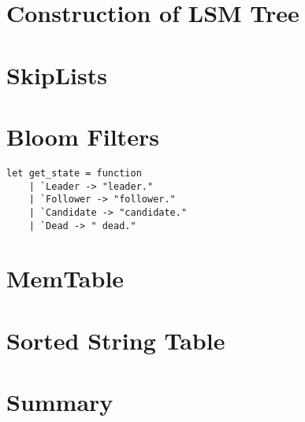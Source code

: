 \documentclass[../../../include/open-logic-chapter]{subfiles}
\begin{document}

\begin{abstract}
\end{abstract}
\newpage

	\section{ Construction of LSM Tree}
	\section{ SkipLists}
	\section{ Bloom Filters}

			\begin{lstlisting}[style=ocamlstyle,caption={A example with parameter in a environment.}]
  let get_state = function
    | `Leader -> "leader."
    | `Follower -> "follower."
    | `Candidate -> "candidate."
    | `Dead -> " dead."
			\end{lstlisting}


	\section{ MemTable}
	\section{ Sorted String Table}
	\section{ Summary }

\OLEndChapterHook
\end{document}
